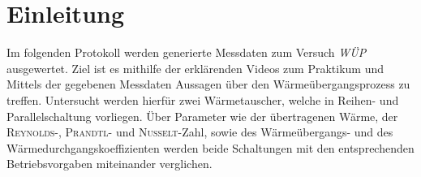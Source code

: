 %
\pagebreak
\section{Einleitung}
\label{sec:einleitung}
Im folgenden Protokoll werden generierte Messdaten zum Versuch \textit{WÜP} ausgewertet. Ziel ist es mithilfe der erklärenden Videos zum Praktikum und Mittels der gegebenen Messdaten Aussagen über den Wärmeübergangsprozess zu treffen. Untersucht werden hierfür zwei Wärmetauscher, welche in Reihen- und Parallelschaltung vorliegen. Über Parameter wie der übertragenen Wärme, der \textsc{Reynolds}-, \textsc{Prandtl}- und \textsc{Nusselt}-Zahl, sowie des Wärmeübergangs- und des Wärmedurchgangskoeffizienten werden beide Schaltungen mit den entsprechenden Betriebsvorgaben miteinander verglichen. 





